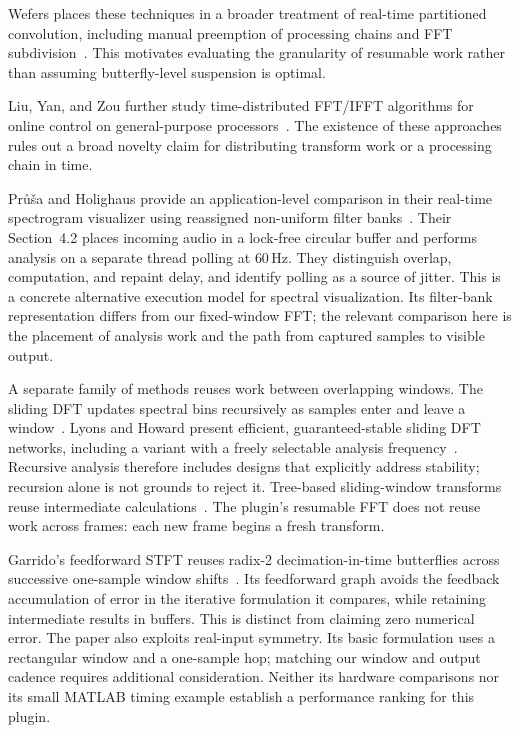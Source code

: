 Wefers places these techniques in a broader treatment of real-time partitioned
convolution, including manual preemption of processing chains and FFT
subdivision~\cite{wefers2015}. This motivates evaluating the granularity of
resumable work rather than assuming butterfly-level suspension is optimal.

Liu, Yan, and Zou further study time-distributed FFT/IFFT algorithms for online control on
general-purpose processors~\cite{liu2017}. The existence of these approaches
rules out a broad novelty claim for distributing transform work or a processing
chain in time.

Pr\r{u}\v{s}a and Holighaus provide an application-level comparison in their
real-time spectrogram visualizer using reassigned non-uniform filter
banks~\cite{prusa2016}. Their Section~4.2 places incoming audio in a lock-free
circular buffer and performs analysis on a separate thread polling at 60\,Hz.
They distinguish overlap, computation, and repaint delay, and identify polling
as a source of jitter. This is a concrete alternative execution model for
spectral visualization. Its filter-bank representation differs from our
fixed-window FFT; the relevant comparison here is the placement of analysis
work and the path from captured samples to visible output.

A separate family of methods reuses work between overlapping windows.
The sliding DFT updates spectral bins recursively as samples enter and leave a
window~\cite{jacobsen2003}. Lyons and Howard present efficient, guaranteed-stable
sliding DFT networks, including a variant with a freely selectable analysis
frequency~\cite{lyons2021}. Recursive analysis therefore includes designs that
explicitly address stability; recursion alone is not grounds to reject it.
Tree-based sliding-window transforms
reuse intermediate calculations~\cite{richardson2019}. The plugin's resumable FFT
does not reuse work across frames: each new frame begins a fresh transform.

Garrido's feedforward STFT reuses radix-2 decimation-in-time butterflies across
successive one-sample window shifts~\cite{garrido2016}. Its feedforward graph
avoids the feedback accumulation of error in the iterative formulation it
compares, while retaining intermediate results in buffers. This is distinct
from claiming zero numerical error. The paper also exploits real-input symmetry.
Its basic formulation uses a rectangular window and a one-sample hop; matching
our window and output cadence requires additional consideration. Neither its
hardware comparisons nor its small MATLAB timing example establish a performance
ranking for this plugin.

